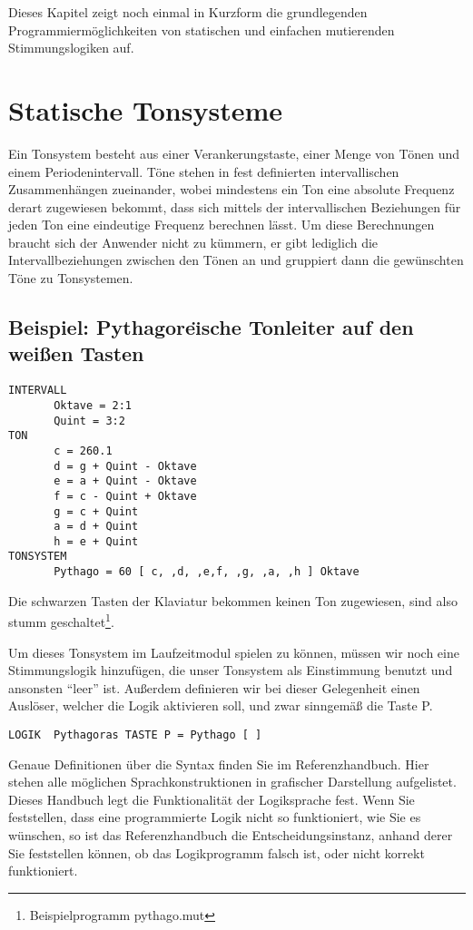 Dieses Kapitel zeigt noch einmal in Kurzform die grundlegenden
Programmiermöglichkeiten von statischen und einfachen mutierenden
Stimmungslogiken auf.

\section{Statische Tonsysteme}\label{sec:statische-tonsysteme}

Ein Tonsystem besteht aus einer Verankerungstaste, einer Menge von
Tönen und einem Periodenintervall. Töne stehen in fest definierten
intervallischen Zusammenhängen zueinander, wobei mindestens ein Ton
eine absolute Frequenz derart zugewiesen bekommt, dass sich mittels
der intervallischen Beziehungen für jeden Ton eine eindeutige
Frequenz berechnen lässt. Um diese Berechnungen braucht sich der
Anwender nicht zu kümmern, er gibt lediglich die Intervallbeziehungen
zwischen den Tönen an und gruppiert dann die gewünschten Töne zu
Tonsystemen.

\subsection{Beispiel: Pythagore\"{\i}sche Tonleiter auf den weißen Tasten}\label{sec:beisp-pyth-tonl}
\label{PYTHAGO}

\begin{verbatim}
INTERVALL
	   Oktave = 2:1
	   Quint = 3:2
TON
	   c = 260.1
	   d = g + Quint - Oktave
	   e = a + Quint - Oktave
	   f = c - Quint + Oktave
	   g = c + Quint
	   a = d + Quint
	   h = e + Quint
TONSYSTEM
	   Pythago = 60 [ c, ,d, ,e,f, ,g, ,a, ,h ] Oktave
\end{verbatim}

Die schwarzen Tasten der Klaviatur bekommen keinen Ton zugewiesen,
sind also stumm geschaltet\footnote{Beispielprogramm pythago.mut}.

Um dieses Tonsystem im Laufzeitmodul spielen zu können, müssen wir
noch eine Stimmungslogik hinzufügen, die unser Tonsystem als
Einstimmung benutzt und ansonsten "`leer"' ist. Außerdem definieren
wir bei dieser Gelegenheit einen Auslöser, welcher die Logik
aktivieren soll, und zwar sinngemäß die Taste P.

\begin{verbatim}
LOGIK  Pythagoras TASTE P = Pythago [ ]
\end{verbatim}

Genaue Definitionen über die Syntax finden Sie im Referenzhandbuch.
Hier stehen alle möglichen Sprachkonstruktionen in grafischer
Darstellung aufgelistet. Dieses Handbuch legt die Funktionalität der
Logiksprache fest. Wenn Sie feststellen, dass eine programmierte Logik
nicht so funktioniert, wie Sie es wünschen, so ist das
Referenzhandbuch die Entscheidungsinstanz, anhand derer Sie
feststellen können, ob das Logikprogramm falsch ist, oder \mutabor{}
nicht korrekt funktioniert.


